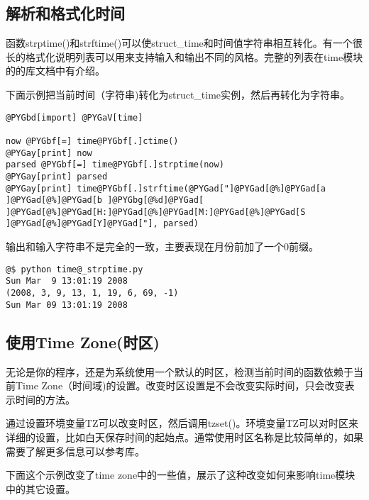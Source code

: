 \documentclass[letterpaper,10pt,english]{manual}
\begin{document}
\subsection{解析和格式化时间}

函数strptime()和strftime()可以使struct\_time和时间值字符串相互转化。有一个很长的格式化说明列表可以用来支持输入和输出不同的风格。完整的列表在time模块的的库文档中有介绍。

下面示例把当前时间（字符串)转化为struct\_time实例，然后再转化为字符串。

\begin{Verbatim}[commandchars=@\[\]]
@PYGbd[import] @PYGaV[time]

now @PYGbf[=] time@PYGbf[.]ctime()
@PYGay[print] now
parsed @PYGbf[=] time@PYGbf[.]strptime(now)
@PYGay[print] parsed
@PYGay[print] time@PYGbf[.]strftime(@PYGad["]@PYGad[@%]@PYGad[a ]@PYGad[@%]@PYGad[b ]@PYGbg[@%d]@PYGad[ ]@PYGad[@%]@PYGad[H:]@PYGad[@%]@PYGad[M:]@PYGad[@%]@PYGad[S ]@PYGad[@%]@PYGad[Y]@PYGad["], parsed)
\end{Verbatim}

输出和输入字符串不是完全的一致，主要表现在月份前加了一个0前缀。

\begin{Verbatim}[commandchars=@\[\]]
@$ python time@_strptime.py
Sun Mar  9 13:01:19 2008
(2008, 3, 9, 13, 1, 19, 6, 69, -1)
Sun Mar 09 13:01:19 2008
\end{Verbatim}


\subsection{使用Time Zone(时区)}

无论是你的程序，还是为系统使用一个默认的时区，检测当前时间的函数依赖于当前Time Zone（时间域)的设置。改变时区设置是不会改变实际时间，只会改变表示时间的方法。

通过设置环境变量TZ可以改变时区，然后调用tzset()。环境变量TZ可以对时区来详细的设置，比如白天保存时间的起始点。通常使用时区名称是比较简单的，如果需要了解更多信息可以参考库。

下面这个示例改变了time zone中的一些值，展示了这种改变如何来影响time模块中的其它设置。
\end{document}
